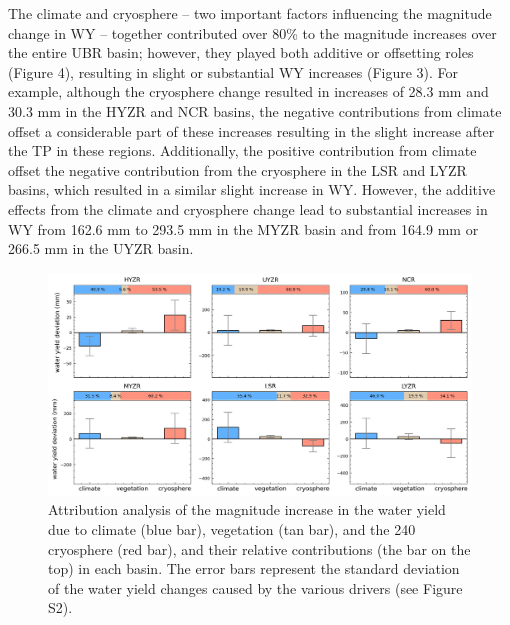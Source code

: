 \documentclass[hess, manuscript]{copernicus}
\begin{document}
The climate and cryosphere -- two important factors influencing the magnitude change in WY -- together contributed over 80\% to the magnitude increases over the entire UBR basin; however, they played both additive or offsetting roles (Figure 4), resulting in slight or substantial WY increases (Figure 3). For example, although the cryosphere change resulted in increases of 28.3 mm and 30.3 mm in the HYZR and NCR basins, the negative contributions from climate offset a considerable part of these increases resulting in the slight increase after the TP in these regions. Additionally, the positive contribution from climate offset the negative contribution from the cryosphere in the LSR and LYZR basins, which resulted in a similar slight increase in WY. However, the additive effects from the climate and cryosphere change lead to substantial increases in WY from 162.6 mm to 293.5 mm in the MYZR basin and from 164.9 mm or 266.5 mm in the UYZR basin.

\begin{figure}[t]
\includegraphics[width=12cm]{01-figures/Fig.4.png}
\caption{Attribution analysis of the magnitude increase in the water yield due to climate (blue bar), vegetation (tan bar), and the
240 cryosphere (red bar), and their relative contributions (the bar on the top) in each basin. The error bars represent the standard deviation of
the water yield changes caused by the various drivers (see Figure S2).}
\label{fig:magnitude-attribution}
\end{figure}
\end{document}
